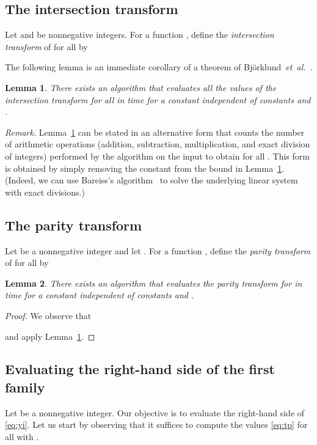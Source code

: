 \documentclass{amsart}
\newtheorem{Lem}{Lemma}
\begin{document}
\subsection{The intersection transform}

Let  and  be nonnegative integers.
For a function , define 
the {\em intersection transform}  of 
for all  by


The following lemma is an immediate corollary of a theorem of Bj\"orklund~{\em et~al.}~\cite[Theorem 1]{BHKK08}.

\begin{Lem}
\label{lem:fit}
There exists an algorithm that evaluates all the  values of the intersection transform
for all  in time  for a 
constant  independent of constants  and . 
\end{Lem}

\noindent
{\em Remark.} 
Lemma~\ref{lem:fit} can be stated in an alternative form that counts 
the number of arithmetic operations 
(addition, subtraction, multiplication, and exact division of integers) 
performed by the algorithm on the input  to obtain  for all 
. This form is obtained by simply removing the constant 
 from the bound in Lemma~\ref{lem:fit}.
(Indeed, we can use Bareiss's algorithm~\cite{B68} to solve the 
underlying linear system with exact divisions.)


\subsection{The parity transform}
\label{sect:parity-trans}

Let  be a nonnegative integer and let . 
For a function , define 
the {\em parity transform}  of 
for all  by


\begin{Lem}
\label{lem:fpt}
There exists an algorithm that evaluates the parity transform
for  in time  for a 
constant  independent of constants  and . 
\end{Lem}
\begin{proof}
We observe that 

and apply Lemma~\ref{lem:fit}.
\end{proof}

\subsection{Evaluating the right-hand side of the first family}
Let  be a nonnegative integer. Our objective is to evaluate 
the right-hand side of \eqref{eq:yi}.
Let us start by observing that it suffices to compute the values
\eqref{eq:tp} for all  with . 
\end{document}

